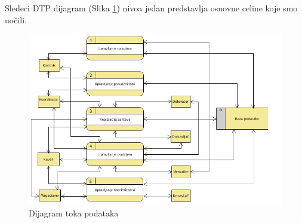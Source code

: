 Sledeci DTP dijagram (Slika \ref{fig:slika2}) nivoa jedan predstavlja osnovne celine koje smo uočili. 
\begin{figure}[ht]
    \leavevmode
    \begin{center}
    \includegraphics[height=0.4\textheight]{slike/DTP.png}
    \end{center}
    \caption{Dijagram toka podataka} %
    \label{fig:slika2}
\end{figure}
